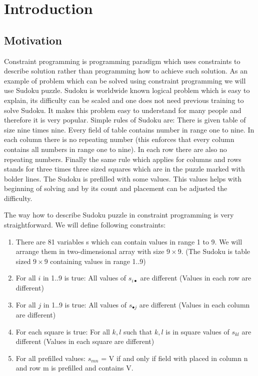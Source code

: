 \chapter{Introduction}
\thispagestyle{myheadings}

\section{Motivation}
Constraint programming is programming paradigm which uses constraints to describe solution rather than programming how to achieve such solution. As an example of problem which can be solved using constraint programming we will use Sudoku puzzle. Sudoku is worldwide known logical problem which is easy to explain, its difficulty can be scaled and one does not need previous training to solve Sudoku. It makes this problem easy to understand for many people and therefore it is very popular. Simple rules of Sudoku are: There is given table of size nine times nine. Every field of table contains number in range one to nine. In each column there is no repeating number (this enforces that every column contains all numbers in range one to nine). In each row there are also no repeating numbers. Finally the same rule which applies for columns and rows stands for three times three sized squares which are in the puzzle marked with bolder lines. The Sudoku is prefilled with some values. This values helps with beginning of solving and by its count and placement can be adjusted the difficulty.

The way how to describe Sudoku puzzle in constraint programming is very straightforward. We will define following constraints:

\begin{enumerate}
\item	There are 81 variables s which can contain values in range 1 to 9. We will arrange them in two-dimensional array with size $9 \times 9$. (The Sudoku is table sized $9 \times 9$ containing values in range 1..9) \\
\item	For all $i$ in 1..9 is true: All values of $s_{i\bullet}$ are different (Values in each row are different) \\
\item	For all $j$ in 1..9 is true: All values of $s_{\bullet j}$ are different (Values in each column are different) \\
\item\label{sudoku-constraint-square}	For each square is true: For all $k,l$ such that $k,l$ is in square values of $s_{kl}$ are different (Values in each square are different) \\
\item	For all prefilled values: $s_{mn}$ = V if and only if field with placed in column n and row m is prefilled and contains V.
\end{enumerate}

